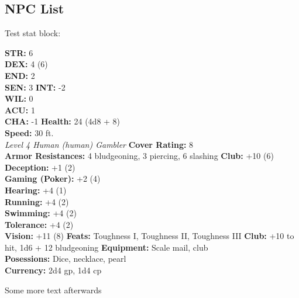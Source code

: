\subsection{NPC List}

Test stat block:

\statblockstats
{
    \textbf{STR:} 6 \\
    \textbf{DEX:} 4 (6) \\
    \textbf{END:} 2 \\
    \textbf{SEN:} 3
}
{
    \textbf{INT:} -2 \\
    \textbf{WIL:} 0 \\
    \textbf{ACU:} 1 \\
    \textbf{CHA:} -1
}
{
    \textbf{Health:} 24 (4d8 + 8) \\
    \textbf{Speed:} 30 ft. \\
    \textit{Level 4 Human (human) Gambler}
}
\statblockdef
{
    \textbf{Cover Rating:} 8 \\
    \textbf{Armor Resistances:} 4 bludgeoning, 3 piercing, 6 slashing
}
\statblockskillsfeats
{
    \textbf{Club:} +10 (6) \\
    \textbf{Deception:} +1 (2) \\
    \textbf{Gaming (Poker):} +2 (4) \\
    \textbf{Hearing:} +4 (1) \\
    \textbf{Running:} +4 (2) \\
    \textbf{Swimming:} +4 (2) \\
    \textbf{Tolerance:} +4 (2) \\
    \textbf{Vision:} +11 (8)
}
{
    \textbf{Feats:} Toughness I, Toughness II, Toughness III
}
\statblockact
{
    \textbf{Club:} +10 to hit, 1d6 + 12 bludgeoning
}
\statblockinv
{
    \textbf{Equipment:} Scale mail, club \\
    \textbf{Posessions:} Dice, necklace, pearl \\
    \textbf{Currency:} 2d4 gp, 1d4 cp
}
\statblockfoot

Some more text afterwards
